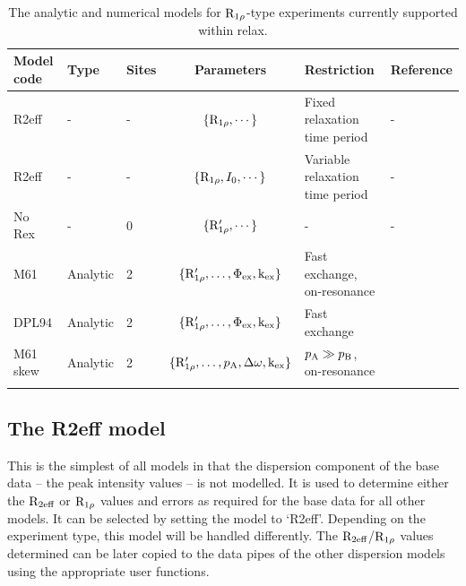 \begin{table}
\begin{center}
\caption{The analytic and numerical models for $\mathrm{R}_{1\rho}$-type experiments currently supported within relax.}
\begin{tabular}{lllcll}
\toprule
Model code & Type     & Sites & Parameters                                        & Restriction                       & Reference \\
\midrule                       
R2eff      & -        & -     & $\{\mathrm{R}_{1\rho}, \cdots\}$                            & Fixed relaxation time period      & - \\
R2eff      & -        & -     & $\{\mathrm{R}_{1\rho}, I_0, \cdots\}$                       & Variable relaxation time period   & - \\
No Rex     & -        & 0     & $\{\mathrm{R}_{1\rho}', \cdots\}$                       & -                                 & - \\
M61        & Analytic & 2     & $\{\mathrm{R}_{1\rho}', \dots, \Phi_\textrm{ex}, \textrm{k}_\textrm{ex}\}$          & Fast exchange, on-resonance       & \citet{Meiboom61} \\
DPL94      & Analytic & 2     & $\{\mathrm{R}_{1\rho}', \dots, \Phi_\textrm{ex}, \textrm{k}_\textrm{ex}\}$          & Fast exchange                     & \citet{Davis94} \\
M61 skew   & Analytic & 2     & $\{\mathrm{R}_{1\rho}', \dots, p_\textrm{A}, \Delta\omega, \textrm{k}_\textrm{ex}\}$        & $p_\textrm{A} \gg p_\textrm{B}$, on-resonance       & \citet{Meiboom61} \\
\bottomrule
\label{table: R1rho dispersion models}
\end{tabular}
\end{center}
\end{table}



\clearpage

\subsection{The R2eff model}
\label{sect: dispersion: R2eff model}

This is the simplest of all models in that the dispersion component of the base data -- the peak intensity values -- is not modelled.  It is used to determine either the $\mathrm{R}_{2\textrm{eff}}$ or $\mathrm{R}_{1\rho}$ values and errors as required for the base data for all other models.  It can be selected by setting the model to `R2eff'.  Depending on the experiment type, this model will be handled differently.  The $\mathrm{R}_{2\textrm{eff}}$/$\mathrm{R}_{1\rho}$ values determined can be later copied to the data pipes of the other dispersion models using the appropriate user functions.


